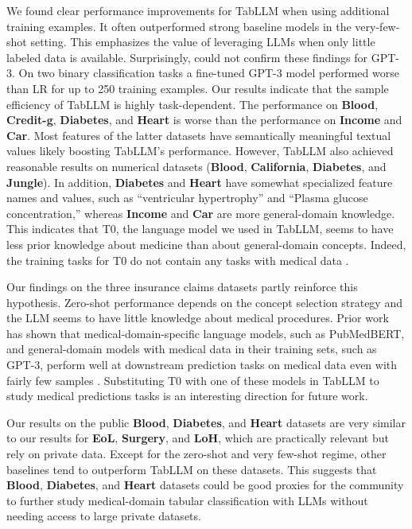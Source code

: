 We found clear performance improvements for TabLLM when using additional training examples. It often outperformed strong baseline models in the very-few-shot setting. This emphasizes the value of leveraging LLMs when only little labeled data is available. Surprisingly, \citet{dinh2022lift} could not confirm these findings for GPT-3. On two binary classification tasks a fine-tuned GPT-3 model performed worse than LR for up to 250 training examples. Our results indicate that the sample efficiency of TabLLM is highly task-dependent. The performance on \textbf{Blood}, \textbf{Credit-g}, \textbf{Diabetes}, and \textbf{Heart} is worse than the performance on \textbf{Income} and \textbf{Car}.
Most features of the latter datasets have semantically meaningful textual values likely boosting TabLLM's performance. However, TabLLM also achieved reasonable results on numerical datasets (\textbf{Blood}, \textbf{California}, \textbf{Diabetes}, and \textbf{Jungle}).
In addition, \textbf{Diabetes} and \textbf{Heart} have somewhat specialized feature names and values, such as ``ventricular hypertrophy'' and ``Plasma glucose concentration,'' whereas \textbf{Income} and \textbf{Car} are more general-domain knowledge. This indicates that T0, the language model we used in TabLLM, seems to have less prior knowledge about medicine than about general-domain concepts. Indeed, the training tasks for T0 do not contain any tasks with medical data \citep{sanh_multitask_2021}.

Our findings on the three insurance claims datasets partly reinforce this hypothesis. Zero-shot performance depends on the concept selection strategy and the LLM seems to have little knowledge about medical procedures. Prior work has shown that medical-domain-specific language models, such as PubMedBERT, and general-domain models with medical data in their training sets, such as GPT-3, perform well at downstream prediction tasks on medical data even with fairly few samples \citep{gu2021domain, agrawal_large_2022}. Substituting T0 with one of these models in TabLLM to study medical predictions tasks is an interesting direction for future work.

Our results on the public \textbf{Blood}, \textbf{Diabetes}, and \textbf{Heart} datasets are very similar to our results for \textbf{EoL}, \textbf{Surgery}, and \textbf{LoH}, which are practically relevant but rely on private data. Except for the zero-shot and very few-shot regime, other baselines tend to outperform TabLLM on these datasets. This suggests that \textbf{Blood}, \textbf{Diabetes}, and \textbf{Heart} datasets could be good proxies for the community to further study medical-domain tabular classification with LLMs without needing access to large private datasets.

